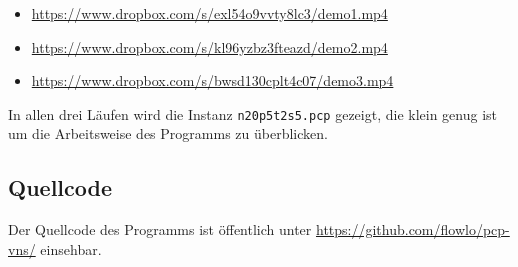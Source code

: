 \documentclass[paper=a4,fontsize=12pt]{scrartcl}
\begin{document}
\begin{itemize}
	\item \url{https://www.dropbox.com/s/exl54o9vvty8lc3/demo1.mp4}
	\item \url{https://www.dropbox.com/s/kl96yzbz3fteazd/demo2.mp4}
	\item \url{https://www.dropbox.com/s/bwsd130cplt4c07/demo3.mp4}
\end{itemize}

In allen drei Läufen wird die Instanz \texttt{n20p5t2s5.pcp} gezeigt, die klein genug ist um die Arbeitsweise des Programms zu überblicken.

\subsection{Quellcode}

Der Quellcode des Programms ist öffentlich unter \url{https://github.com/flowlo/pcp-vns/} einsehbar.
\end{document}
